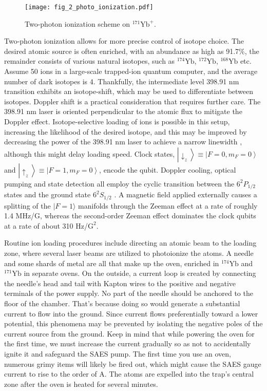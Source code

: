 \begin{figure}
    \centering
    \texttt{[image: fig\_2\_photo\_ionization.pdf]}
    \caption{Two-photon ionization scheme on ${ }^{171} \mathrm{Yb}^{+}$.}
    \label{fig:photo_ionization}
\end{figure}

Two-photon ionization allows for more precise control of isotope choice. The desired atomic source is often enriched, with an abundance as high as 91.7\%, the remainder consists of various natural isotopes, such as ${ }^{174} \mathrm{Yb}$, ${ }^{172} \mathrm{Yb}$, ${ }^{168} \mathrm{Yb}$ etc. Assume 50 ions in a large-scale trapped-ion quantum computer, and the average number of dark isotopes is 4. Thankfully, the intermediate level 398.91 nm transition exhibits an isotope-shift, which may be used to differentiate between isotopes. Doppler shift is a practical consideration that requires further care. The 398.91 nm laser is oriented perpendicular to the atomic flux to mitigate the Doppler effect. Isotope-selective loading of ions is possible in this setup, increasing the likelihood of the desired isotope, and this may be improved by decreasing the power of the 398.91 nm laser to achieve a narrow linewidth , although this might delay loading speed. Clock states, $\left|\downarrow_z\right\rangle \equiv\left|F=0, m_F=0\right\rangle$ and $\left|\uparrow_z\right\rangle \equiv\left|F=1, m_F=0\right\rangle$, encode the qubit. Doppler cooling, optical pumping and state detection all employ the cyclic transition between the $6^2 P_{1 / 2}$ states and the ground state $6^2 S_{1 / 2}$ \cite{RN218}. A magnetic field applied externally causes a splitting of the $|F=1\rangle$ manifolds through the Zeeman effect at a rate of roughly 1.4 MHz/G, whereas the second-order Zeeman effect dominates the clock qubits at a rate of about 310 Hz/$\mathrm{G}^2$.

Routine ion loading procedures include directing an atomic beam to the loading zone, where several laser beams are utilized to photoionize the atoms. A needle and some shards of metal are all that make up the oven, enriched in ${ }^{174} \mathrm{Yb}$ and ${ }^{171} \mathrm{Yb}$ in separate ovens. On the outside, a current loop is created by connecting the needle's head and tail with Kapton wires to the positive and negative terminals of the power supply. No part of the needle should be anchored to the floor of the chamber. That's because doing so would generate a substantial current to flow into the ground. Since current flows preferentially toward a lower potential, this phenomena may be prevented by isolating the negative poles of the current source from the ground. Keep in mind that while powering the oven for the first time, we must increase the current gradually so as not to accidentally ignite it and safeguard the SAES pump. The first time you use an oven, numerous grimy items will likely be fired out, which might cause the SAES gauge current to rise to the order of A. The atoms are expelled into the trap's central zone after the oven is heated for several minutes.

